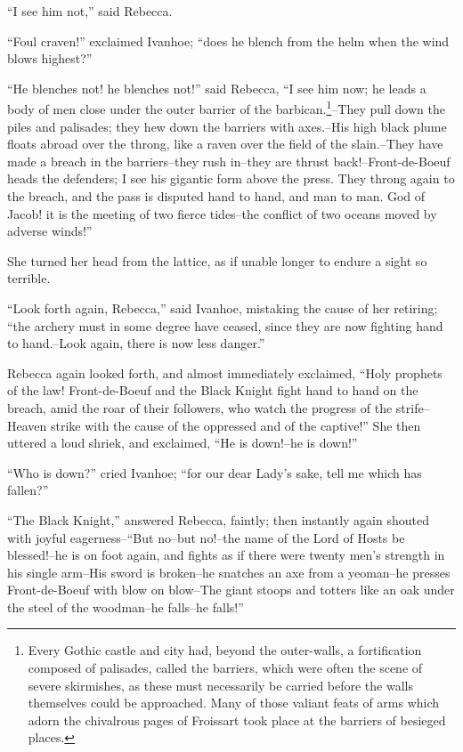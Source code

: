 ``I see him not,'' said Rebecca.

``Foul craven!'' exclaimed Ivanhoe; ``does he blench from the helm when
the wind blows highest?''

``He blenches not! he blenches not!'' said Rebecca, ``I see him now; he
leads a body of men close under the outer barrier of the
barbican.\footnote{Every Gothic castle and city had, beyond the
outer-walls, a fortification composed of palisades, called the barriers,
which were often the scene of severe skirmishes, as these must
necessarily be carried before the walls themselves could be approached.
Many of those valiant feats of arms which adorn the chivalrous pages of
Froissart took place at the barriers of besieged places.}--They pull down
the piles and palisades; they hew down the
barriers with axes.--His high black plume floats abroad over the throng,
like a raven over the field of the slain.--They have made a breach in
the barriers--they rush in--they are thrust back!--Front-de-Boeuf heads
the defenders; I see his gigantic form above the press. They throng
again to the breach, and the pass is disputed hand to hand, and man to
man. God of Jacob! it is the meeting of two fierce tides--the conflict
of two oceans moved by adverse winds!''

She turned her head from the lattice, as if unable longer to endure a
sight so terrible.

``Look forth again, Rebecca,'' said Ivanhoe, mistaking the cause of her
retiring; ``the archery must in some degree have ceased, since they are
now fighting hand to hand.--Look again, there is now less danger.''

Rebecca again looked forth, and almost immediately exclaimed, ``Holy
prophets of the law! Front-de-Boeuf and the Black Knight fight hand to
hand on the breach, amid the roar of their followers, who watch the
progress of the strife--Heaven strike with the cause of the oppressed
and of the captive!'' She then uttered a loud shriek, and exclaimed,
``He is down!--he is down!''

``Who is down?'' cried Ivanhoe; ``for our dear Lady's sake, tell me
which has fallen?''

``The Black Knight,'' answered Rebecca, faintly; then instantly again
shouted with joyful eagerness--``But no--but no!--the name of the Lord
of Hosts be blessed!--he is on foot again, and fights as if there were
twenty men's strength in his single arm--His sword is broken--he
snatches an axe from a yeoman--he presses Front-de-Boeuf with blow on
blow--The giant stoops and totters like an oak under the steel of the
woodman--he falls--he falls!''

